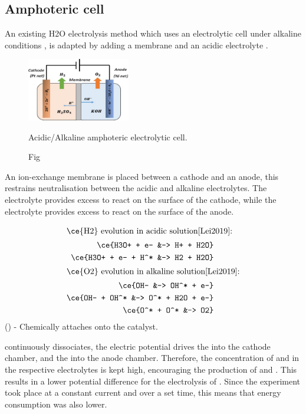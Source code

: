 \subsection{Amphoteric cell}%
\label{sub:some_kind_of_splitting_method_}

An existing H2O electrolysis method which uses an electrolytic cell under alkaline conditions \cite{Zeng2010}, is adapted by adding a membrane and an acidic electrolyte \cite{Lei2019}.

\begin{figure}[H]
	\centering
	\includegraphics[width=0.4\textwidth]{amphoteric_cell.png}
	\caption{Fig}{Acidic/Alkaline amphoteric electrolytic cell\cite{Lei2019}.}
	\label{fig:amphoteric_cell_diagram}
\end{figure}

An ion-exchange membrane is placed between a  cathode and an  anode, this restrains neutralisation between the acidic and alkaline electrolytes.
The  electrolyte provides excess  to react on the surface of the cathode, while the  electrolyte provides excess  to react on the surface of the anode.

\begin{align}
	\intertext{\ce{H2} evolution in acidic solution\cite{Lei2019}:} 
	\ce{H3O+ + e- &-> H+ + H2O}\\
	\ce{H3O+ + e- + H^* &-> H2 + H2O}\\
	\intertext{\ce{O2} evolution in alkaline solution\cite{Lei2019}:}
	\ce{OH- &-> OH^* + e-}\\
	\ce{OH- + OH^* &-> O^* + H2O + e-}\\
	\ce{O^* + O^* &-> O2}
\end{align}
(\ce{^*}) - Chemically attaches onto the catalyst.

 continuously dissociates, the electric potential drives the  into the cathode chamber, and the  into the anode chamber.
Therefore, the concentration of  and  in the respective electrolytes is kept high, encouraging the production of  and .
This results in a lower potential difference for the electrolysis of .
Since the experiment took place at a constant current and over a set time, this means that energy consumption was also lower.

